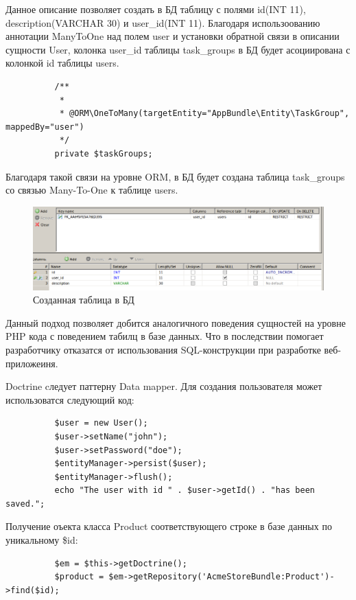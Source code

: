 Данное описание позволяет создать в БД таблицу с  полями id(INT 11), description(VARCHAR 30) и user\_id(INT 11). Благодаря использоованию аннотации ManyToOne над полем user и установки обратной связи в описании сущности User, колонка user\_id таблицы task\_groups в БД будет асоциирована с колонкой id таблицы users.

\begin{lstlisting}
          /**
           *
           * @ORM\OneToMany(targetEntity="AppBundle\Entity\TaskGroup", mappedBy="user")
           */
          private $taskGroups;
\end{lstlisting}

Благодаря такой связи на уровне ORM, в БД будет создана таблица task\_groups со связью Many-To-One к таблице users.

\begin{figure}[ht]
\centering
  \includegraphics[scale=0.4]{images/table_tg.png}  
  \caption{  Созданная таблица в БД }
  \label{fig:domain:symfony_request_workflow}
\end{figure}

Данный подход позволяет добится аналогичного поведения сущностей на уровне PHP кода с поведением табилц в базе данных. Что в последствии помогает разработчику отказатся от использования SQL-конструкции при разработке веб-приложеиня. 

Doctrine cледует паттерну Data mapper. Для создания пользователя может использоватся следующий код:

\begin{lstlisting}
          $user = new User();
          $user->setName("john");
          $user->setPassword("doe");
          $entityManager->persist($user);
          $entityManager->flush();
          echo "The user with id " . $user->getId() . "has been saved.";
\end{lstlisting}


Получение оъекта класса Product соответствующего строке в базе данных по уникальному \$id:
\begin{lstlisting}
          $em = $this->getDoctrine();
          $product = $em->getRepository('AcmeStoreBundle:Product')->find($id);
\end{lstlisting}


